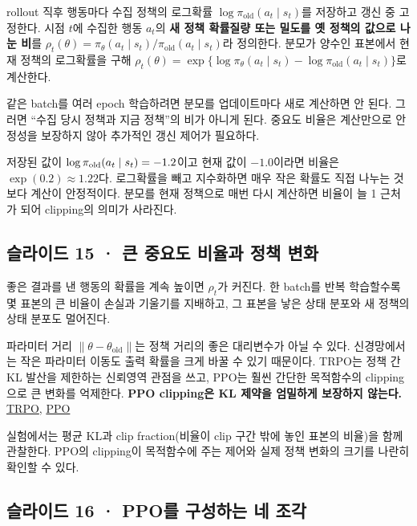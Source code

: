 \documentclass[11pt,a4paper]{article}
\begin{document}
rollout 직후 행동마다 수집 정책의 로그확률 $\log\pi_{\mathrm{old}}(a_t\mid s_t)$를 저장하고 갱신 중 고정한다. 시점 $t$에 수집한 행동 $a_t$의 \textbf{새 정책 확률질량 또는 밀도를 옛 정책의 값으로 나눈 비}를 $\rho_t(\theta)=\pi_\theta(a_t\mid s_t)/\pi_{\mathrm{old}}(a_t\mid s_t)$라 정의한다. 분모가 양수인 표본에서 현재 정책의 로그확률을 구해 $\rho_t(\theta)=\exp\{\log\pi_\theta(a_t\mid s_t)-\log\pi_{\mathrm{old}}(a_t\mid s_t)\}$로 계산한다.\par

같은 batch를 여러 epoch 학습하려면 분모를 업데이트마다 새로 계산하면 안 된다. 그러면 “수집 당시 정책과 지금 정책”의 비가 아니게 된다. 중요도 비율은 계산만으로 안정성을 보장하지 않아 추가적인 갱신 제어가 필요하다.\par

저장된 값이 $\log\pi_{\rm old}(a_t\mid s_t)=-1.2$이고 현재 값이 $-1.0$이라면 비율은 $\exp(0.2)\approx1.22$다. 로그확률을 빼고 지수화하면 매우 작은 확률도 직접 나누는 것보다 계산이 안정적이다. 분모를 현재 정책으로 매번 다시 계산하면 비율이 늘 1 근처가 되어 clipping의 의미가 사라진다.\par

\subsection{슬라이드 15 · 큰 중요도 비율과 정책 변화}

좋은 결과를 낸 행동의 확률을 계속 높이면 $\rho_t$가 커진다. 한 batch를 반복 학습할수록 몇 표본의 큰 비율이 손실과 기울기를 지배하고, 그 표본을 낳은 상태 분포와 새 정책의 상태 분포도 멀어진다.\par

파라미터 거리 $\|\theta-\theta_{\mathrm{old}}\|$는 정책 거리의 좋은 대리변수가 아닐 수 있다. 신경망에서는 작은 파라미터 이동도 출력 확률을 크게 바꿀 수 있기 때문이다. TRPO는 정책 간 KL 발산을 제한하는 신뢰영역 관점을 쓰고, PPO는 훨씬 간단한 목적함수의 clipping으로 큰 변화를 억제한다. \textbf{PPO clipping은 KL 제약을 엄밀하게 보장하지 않는다.} \href{https://arxiv.org/abs/1502.05477}{TRPO}, \href{https://arxiv.org/abs/1707.06347}{PPO}\par

실험에서는 평균 KL과 clip fraction(비율이 clip 구간 밖에 놓인 표본의 비율)을 함께 관찰한다. PPO의 clipping이 목적함수에 주는 제어와 실제 정책 변화의 크기를 나란히 확인할 수 있다.\par

\subsection{슬라이드 16 · PPO를 구성하는 네 조각}
\end{document}
